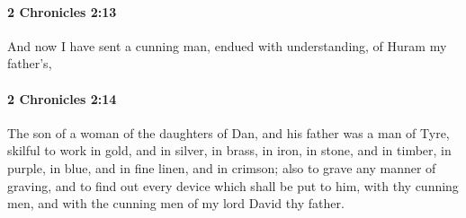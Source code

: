		\paragraph{2 Chronicles 2:13} %
			\label{2CHRONICLES-2-13}

			And now I have sent a cunning man, endued with understanding, of Huram my father's,


		\paragraph{2 Chronicles 2:14} %
			\label{2CHRONICLES-2-14}

			The son of a woman of the daughters of Dan, and his father was a man of Tyre, skilful to work in gold, and in silver, in brass, in iron, in stone, and in timber, in purple, in blue, and in fine linen, and in crimson; also to grave any manner of graving, and to find out every device which shall be put to him, with thy cunning men, and with the cunning men of my lord David thy father.

